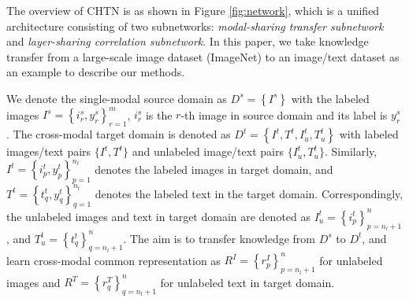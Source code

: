 \documentclass{article}
\begin{document}
The overview of CHTN is as shown in Figure \ref{fig:network}, which is a unified architecture consisting of two subnetworks: \emph{modal-sharing transfer subnetwork} and \emph{layer-sharing correlation subnetwork}. In this paper, we take knowledge transfer from a large-scale image dataset (ImageNet) to an image/text dataset as an example to describe our methods.

We denote the single-modal source domain as $D^s=\left \{I^{s}\right \}$ with the labeled images $I^{s}=\left \{i_{r}^{s},y_{r}^{s}\right \}_{r=1}^{m}$,  $i_{r}^{s}$ is the $r$-th image in source domain and its label is $y_r^s$.
The cross-modal target domain is denoted as $D^t=\left \{I^{t},T^{t},I_u^{t},T_u^{t}\right \}$ with labeled images/text pairs $\{{I^{t},T^{t}}\}$ and unlabeled image/text pairs $\{{I_u^{t},T_u^{t}}\}$.  Similarly, $I^{t}=\left \{i_{p}^{t}, y_p^{t}\right \}_{p=1}^{n_l}$ denotes the labeled images in target domain, and $T^{t}=\left \{t_{q}^{t},y_{q}^{t}\right \}_{q=1}^{n_l}$ denotes the labeled text in the target domain. Correspondingly, the unlabeled images and text in target domain are denoted as $I_u^{t}=\left \{i_{p}^{t}\right \}_{p=n_l+1}^{n}$, and $T_u^{t}=\left \{t_{q}^{t}\right \}_{q=n_l+1}^{n}$. The aim is to transfer knowledge from $D^s$ to $D^t$, and learn cross-modal common representation as $R^{I}=\left \{r_{p}^{I}\right \}_{p=n_l+1}^{n}$ for unlabeled images and $R^{T}=\left \{r_{q}^{T}\right \}_{q=n_l+1}^{n}$ for unlabeled text in target domain. 

\end{document}
